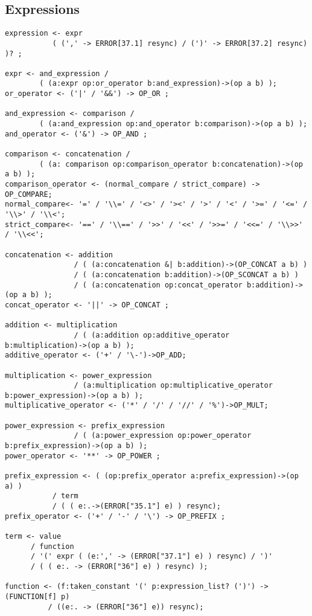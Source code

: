 \subsection{Expressions}

\begin{verbatim}
expression <- expr  
           ( (',' -> ERROR[37.1] resync) / (')' -> ERROR[37.2] resync) )? ;

expr <- and_expression / 
        ( (a:expr op:or_operator b:and_expression)->(op a b) );
or_operator <- ('|' / '&&') -> OP_OR ;

and_expression <- comparison / 
        ( (a:and_expression op:and_operator b:comparison)->(op a b) );
and_operator <- ('&') -> OP_AND ;

comparison <- concatenation / 
        ( (a: comparison op:comparison_operator b:concatenation)->(op a b) );
comparison_operator <- (normal_compare / strict_compare) -> OP_COMPARE;
normal_compare<- '=' / '\\=' / '<>' / '><' / '>' / '<' / '>=' / '<=' / '\\>' / '\\<';
strict_compare<- '==' / '\\==' / '>>' / '<<' / '>>=' / '<<=' / '\\>>' / '\\<<';

concatenation <- addition 
                / ( (a:concatenation &| b:addition)->(OP_CONCAT a b) ) 
                / ( (a:concatenation b:addition)->(OP_SCONCAT a b) )  
                / ( (a:concatenation op:concat_operator b:addition)->(op a b) );
concat_operator <- '||' -> OP_CONCAT ;

addition <- multiplication 
                / ( (a:addition op:additive_operator b:multiplication)->(op a b) );
additive_operator <- ('+' / '\-')->OP_ADD;

multiplication <- power_expression 
                / (a:multiplication op:multiplicative_operator b:power_expression)->(op a b) );
multiplicative_operator <- ('*' / '/' / '//' / '%')->OP_MULT;

power_expression <- prefix_expression 
                / ( (a:power_expression op:power_operator b:prefix_expression)->(op a b) );
power_operator <- '**' -> OP_POWER ;

prefix_expression <- ( (op:prefix_operator a:prefix_expression)->(op a) ) 
           / term 
           / ( ( e:.->(ERROR["35.1"] e) ) resync);
prefix_operator <- ('+' / '-' / '\') -> OP_PREFIX ;

term <- value
      / function 
      / '(' expr ( (e:',' -> (ERROR["37.1"] e) ) resync) / ')' 
      / ( ( e:. -> (ERROR["36"] e) ) resync) );

function <- (f:taken_constant '(' p:expression_list? (')') -> (FUNCTION[f] p)
          / ((e:. -> (ERROR["36"] e)) resync);
\end{verbatim}
